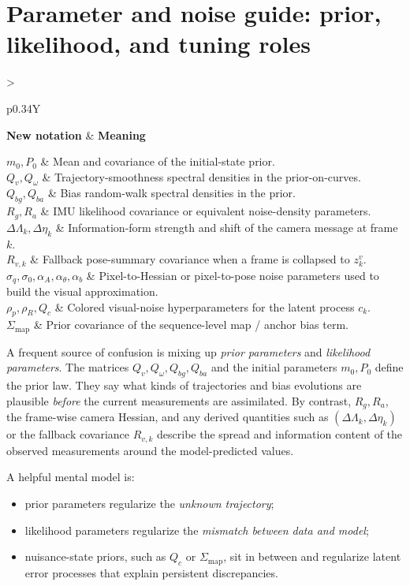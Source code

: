 \documentclass[11pt]{report}
\newcommand{\NotationTable}[1]{%
\vspace{0.6mm}
{\scriptsize
\setlength{\tabcolsep}{2.5pt}
\begin{tabularx}{\columnwidth}{>{\raggedright\arraybackslash}p{0.34\columnwidth}Y}
\toprule
\textbf{New notation} & \textbf{Meaning}\\
\midrule
#1\\
\bottomrule
\end{tabularx}}
\vspace{0.8mm}}
\begin{document}
\section{Parameter and noise guide: prior, likelihood, and tuning roles}
\NotationTable{
$m_0,P_0$ & Mean and covariance of the initial-state prior.\\
$Q_v,Q_\omega$ & Trajectory-smoothness spectral densities in the prior-on-curves.\\
$Q_{bg},Q_{ba}$ & Bias random-walk spectral densities in the prior.\\
$R_g,R_a$ & IMU likelihood covariance or equivalent noise-density parameters.\\
$\Delta\Lambda_k,\Delta\eta_k$ & Information-form strength and shift of the camera message at frame $k$.\\
$R_{v,k}$ & Fallback pose-summary covariance when a frame is collapsed to $z_k^v$.\\
$\sigma_q,\sigma_0,\alpha_A,\alpha_\theta,\alpha_b$ & Pixel-to-Hessian or pixel-to-pose noise parameters used to build the visual approximation.\\
$\rho_p,\rho_R,Q_c$ & Colored visual-noise hyperparameters for the latent process $c_k$.\\
$\Sigma_{\mathrm{map}}$ & Prior covariance of the sequence-level map / anchor bias term.}

A frequent source of confusion is mixing up \emph{prior parameters} and \emph{likelihood parameters}. The matrices $Q_v,Q_\omega,Q_{bg},Q_{ba}$ and the initial parameters $m_0,P_0$ define the prior law. They say what kinds of trajectories and bias evolutions are plausible \emph{before} the current measurements are assimilated. By contrast, $R_g,R_a$, the frame-wise camera Hessian, and any derived quantities such as $(\Delta\Lambda_k,\Delta\eta_k)$ or the fallback covariance $R_{v,k}$ describe the spread and information content of the observed measurements around the model-predicted values.

A helpful mental model is:
\begin{itemize}
  \item prior parameters regularize the \emph{unknown trajectory};
  \item likelihood parameters regularize the \emph{mismatch between data and model};
  \item nuisance-state priors, such as $Q_c$ or $\Sigma_{\mathrm{map}}$, sit in between and regularize latent error processes that explain persistent discrepancies.
\end{itemize}
\end{document}
